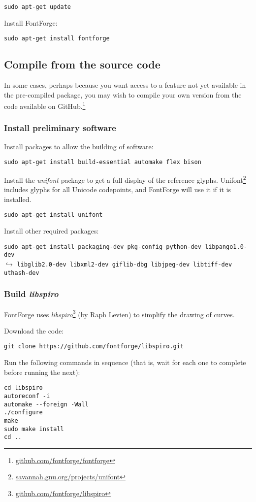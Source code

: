 \verb|sudo apt-get update|

Install FontForge:

\verb|sudo apt-get install fontforge|


\subsection{Compile from the source code}

In some cases, perhaps because you want access to a feature not yet available in the pre-compiled package, you may wish to compile your own version from the code available on GitHub.\footnote{\url{github.com/fontforge/fontforge}}

\subsubsection{Install preliminary software}

Install packages to allow the building of software:

\verb|sudo apt-get install build-essential automake flex bison|

Install the \textit{unifont} package to get a full display of the reference glyphs.  Unifont\footnote{\url{savannah.gnu.org/projects/unifont}} includes glyphs for all Unicode codepoints, and FontForge will use it if it is installed.

\verb|sudo apt-get install unifont|

Install other required packages: 

\verb|sudo apt-get install packaging-dev pkg-config python-dev libpango1.0-dev|\\
$\hookrightarrow$ \verb|libglib2.0-dev libxml2-dev giflib-dbg libjpeg-dev libtiff-dev uthash-dev|

\subsubsection{Build \textit{libspiro}}

FontForge uses \textit{libspiro}\footnote{\url{github.com/fontforge/libspiro}} (by Raph Levien) to simplify the drawing of curves.

Download the code:

\verb|git clone https://github.com/fontforge/libspiro.git|

Run the following commands in sequence (that is, wait for each one to complete before running the next):
\begin{verbatim}
cd libspiro
autoreconf -i
automake --foreign -Wall
./configure
make
sudo make install
cd ..
\end{verbatim}


